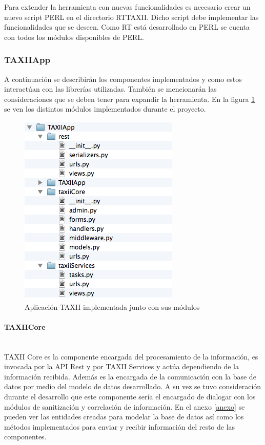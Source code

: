 Para extender la herramienta con nuevas funcionalidades es necesario crear un nuevo script PERL en el directorio RTTAXII. Dicho script debe implementar las funcionalidades que se deseen. Como RT está desarrollado en PERL se cuenta con todos los módulos disponibles de PERL.

\subsubsection{TAXIIApp}
A continuación se describirán los componentes implementados y como estos interactúan con las librerías utilizadas.
También se mencionarán las consideraciones que se deben tener para expandir la herramienta.
En la figura \ref{fig.taxii_app} se ven los distintos módulos implementados durante el proyecto. 

\begin{figure}[H]
	\centering
	\includegraphics{imagenes/TAXIIApp.png}
	\caption{Aplicación TAXII implementada junto con sus módulos}
	\label{fig.taxii_app}
\end{figure}
\bigskip
\paragraph{TAXIICore}\ \\
TAXII Core es la componente encargada del procesamiento de la información, es invocada por la API Rest y por TAXII Services y actúa dependiendo de la información recibida. Además es la encargada de la comunicación con la base de datos por medio del modelo de datos desarrollado. A su vez se tuvo consideración durante el desarrollo que este componente sería el encargado de dialogar con los módulos de sanitización y correlación de información. 
En el anexo \ref{anexo} se pueden ver las entidades creadas para modelar la base de datos así como los métodos implementados para enviar y recibir información del resto de las componentes.

